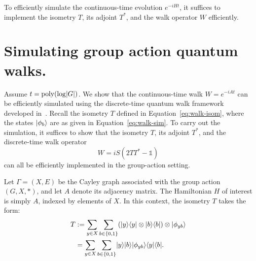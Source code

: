 \documentclass[12pt]{report}
\begin{document}
To efficiently simulate the continuous-time evolution \( e^{-iHt} \), it suffices to implement the isometry \( T \), its adjoint \( T^* \), and the walk operator \( W \) efficiently.








\section{Simulating group action quantum walks.}
Assume \( t = \operatorname{poly}(\log \lvert G\rvert) \). We show that the continuous-time walk \( W = e^{-iAt} \) can be efficiently simulated using the discrete-time quantum walk framework developed in~\cite{childs2010relationship}. Recall the isometry \( T \) defined in Equation~\eqref{eq:walk-isom}, where the states \( \lvert\phi_b\rangle \) are as given in Equation~\eqref{eq:walk-sim}. To carry out the simulation, it suffices to show that the isometry \( T \), its adjoint \( T^* \), and the discrete-time walk operator
\[
W = iS(2TT^* - \mathds{1})
\]
can all be efficiently implemented in the group-action setting.


Let \( \Gamma = (X, E) \) be the Cayley graph associated with the group action \( (G, X, *) \), and let \( A \) denote its adjacency matrix. The Hamiltonian \( H \) of interest is simply \( A \), indexed by elements of \( X \). In this context, the isometry \( T \) takes the form:
\begin{align*}
T
& := \sum_{y \in X} \sum_{b \in \{0, 1\}} (\lvert y\rangle\langle y\rvert \otimes \lvert b\rangle\langle b\rvert) \otimes \lvert\phi_{yb}\rangle \\
& = \sum_{y \in X} \sum_{b \in \{0, 1\}} \lvert y\rangle \lvert b\rangle \lvert\phi_{yb}\rangle \langle y\rvert \langle b\rvert.
\end{align*}
\end{document}
